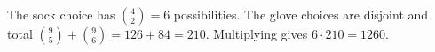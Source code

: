 The sock choice has $\binom42=6$ possibilities. The glove choices are disjoint and total $\binom95+\binom96=126+84=210$. Multiplying gives $6\cdot210=\boxed{1260}$.

